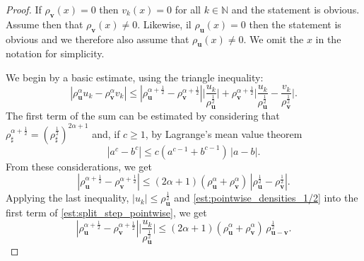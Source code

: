 \documentclass[12pt,a4paper]{amsart}
\numberwithin{equation}{section}
\newcommand{\ulu}{\boldsymbol{u}}
\newcommand{\ulv}{\boldsymbol{v}}
\begin{document}
	\begin{proof}
		If $\rho_{\ulv}(x)=0$ then $v_k(x)=0$ for all $k\in\mathbb{N}$ and the statement is obvious. Assume then that $\rho_{\ulv}(x)\neq0$. Likewise, il $\rho_{\ulu}(x)=0$ then the statement is obvious and we therefore also assume that $\rho_{\ulu}(x)\neq0$. We omit the $x$ in the notation for simplicity.
		
		We begin by a basic estimate, using the triangle inequality:
		\begin{equation}
			| \rho_{\ulu}^\alpha  u_k  - \rho_{\ulv}^\alpha  v_k |  %
			\leq   | \rho_{\ulu}^{\alpha+\frac{1}{2}}  - 			\rho_{\ulv}^{\alpha+\frac{1}{2}}  | \Bigg| 			\frac{u_k}{\rho_{\ulu}^{\frac{1}{2}}}  \Bigg| + \rho_{\ulv}^{\alpha+\frac{1}{2}}  \Bigg| 	\frac{u_k}{\rho_{\ulu}^{\frac{1}{2}}} - \frac{v_k}{\rho_{\ulv}^{\frac{1}{2}}} \Bigg| . \label{est:split_step_pointwise}
		\end{equation}
		The first term of the sum can be estimated by considering that $ \rho_{\sharp}^{\alpha+\frac{1}{2}}  =  ( \rho_{\sharp}^{\frac{1}{2}}  )^{2 \alpha + 1} $ and, 
		if $c\geq1 $, by Lagrange's mean value theorem
		\begin{equation*}
			| a^c - b^c | \leq c (a^{c-1} + b^{c-1})\, |a-b| .
		\end{equation*}
		From these considerations, we get
		\begin{equation*}
			| \rho_{\ulu}^{\alpha+\frac{1}{2}}  - \rho_{\ulv}^{\alpha+\frac{1}{2}}  | \leq (2\alpha +1) ( \rho_{\ulu}^{\alpha}  +  \rho_{\ulv}^{\alpha} ) \, |  \rho_{\ulu}^{\frac{1}{2}}  - \rho_{\ulv}^{\frac{1}{2}}  | .
		\end{equation*}
		Applying the last inequality, $|u_k|\le \rho_{\ulu}^{\frac{1}{2}}$ and \eqref{est:pointwise_densities_1/2} into the first term of \eqref{est:split_step_pointwise}, we get%
		\begin{equation}\label{est:split_step_pointwise2}
			| \rho_{\ulu}^{\alpha+\frac{1}{2}}  - \rho_{\ulv}^{\alpha+\frac{1}{2}}  | \Bigg| 			\frac{u_k}{\rho_{\ulu}^{\frac{1}{2}}}  \Bigg|\leq  (2\alpha+1)( \rho_{\ulu}^{\alpha}  +  \rho_{\ulv}^{\alpha} ) \, \rho_{\ulu-\ulv}^{\frac{1}{2}} .

\end{equation}
\end{proof}
\end{document}
